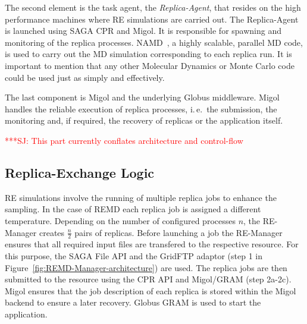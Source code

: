 \documentclass{rspublic}
\newcommand{\alnote}[1]{ {\textcolor{blue} { ***AL: #1 }}}
\newcommand{\jhanote}[1]{ {\textcolor{red} { ***SJ: #1 }}}
\newcommand{\alnote}[1]{}
\newcommand{\jhanote}[1]{}
\newcommand{\replicaagent}[1]{Replica-Agent }
\newcommand{\remanager}[1]{RE-Manager }
\begin{document}
The second element is the task agent, the \textit{Replica-Agent},
that resides on the high performance machines where RE simulations
are carried out. The \replicaagent\ is launched using SAGA CPR and Migol.
It is responsible for spawning and monitoring of the replica processes. 
NAMD~\citep{Phillips:2005gd}, a highly scalable, parallel MD
code, is used to carry out the MD simulation corresponding to each
replica run. It is important to mention that any other Molecular Dynamics 
or Monte Carlo code could be used just as simply and effectively.

The last component is Migol and the underlying Globus middleware. 
Migol handles the reliable execution of replica processes, i.\,e.\ the submission,
the monitoring and, if required, the recovery of replicas or the application itself.


                                  

\jhanote{This part currently conflates architecture and control-flow}
                       
\subsection{Replica-Exchange Logic}
                                            
RE simulations involve the running of multiple replica jobs to enhance the sampling. 
In the case of REMD each replica job is assigned a different temperature.  
Depending on the number of configured processes $n$, the \remanager\
creates $\frac{n}{2}$ pairs of replicas.
Before launching a job the \remanager\ ensures that all required input 
files are transfered to the respective resource. For this purpose, the SAGA File API and the
GridFTP adaptor (step 1 in Figure~\ref{fig:REMD-Manager-architecture})
are used.  The replica jobs are then submitted to the resource
using the CPR API and Migol/GRAM (step 2a-2c). Migol ensures that the
job description of each replica is stored within the Migol backend
to ensure a later recovery. Globus GRAM is used to start the
application.
\end{document}

